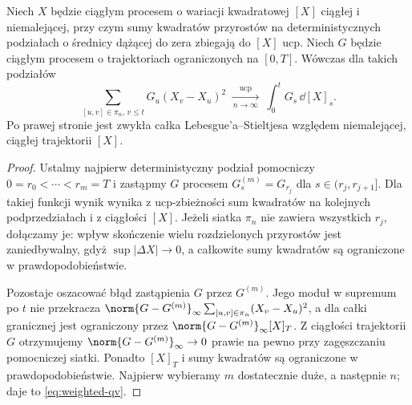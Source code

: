\begin{lemat}
\label{lem:weighted-qv}
Niech $X$ będzie ciągłym procesem o wariacji kwadratowej
$[X]$ ciągłej i niemalejącej, przy czym sumy kwadratów
przyrostów na deterministycznych podziałach o średnicy
dążącej do zera zbiegają do $[X]$ ucp. Niech $G$ będzie
ciągłym procesem o trajektoriach ograniczonych na $[0,T]$.
Wówczas dla takich podziałów
\[
\sum_{[u,v]\in\pi_n,\,v\le t}G_u(X_v-X_u)^2
\ \xrightarrow[\,n\to\infty\,]{\mathrm{ucp}}\
\int_0^tG_s\,\dd[X]_s.
\tag{3.2}\label{eq:weighted-qv}
\]
Po prawej stronie jest zwykła całka Lebesgue'a--Stieltjesa
względem niemalejącej, ciągłej trajektorii $[X]$.
\end{lemat}
\begin{proof}
Ustalmy najpierw deterministyczny podział pomocniczy
$0=r_0<\cdots<r_m=T$ i zastąpmy $G$ procesem
$G^{(m)}_s=G_{r_j}$ dla $s\in(r_j,r_{j+1}]$.
Dla takiej funkcji wynik wynika z ucp-zbieżności
sum kwadratów na kolejnych podprzedziałach i z
ciągłości $[X]$. Jeżeli siatka $\pi_n$ nie zawiera
wszystkich $r_j$, dołączamy je: wpływ skończenie wielu
rozdzielonych przyrostów jest zaniedbywalny, gdyż
$\sup|\Delta X|\to0$, a całkowite sumy kwadratów są
ograniczone w prawdopodobieństwie.

Pozostaje oszacować błąd zastąpienia $G$ przez $G^{(m)}$.
Jego moduł w supremum po $t$ nie przekracza
$\norm{G-G^{(m)}}_\infty\sum_{[u,v]\in\pi_n}(X_v-X_u)^2$,
a dla całki granicznej jest ograniczony przez
$\norm{G-G^{(m)}}_\infty[X]_T$. Z ciągłości trajektorii
$G$ otrzymujemy $\norm{G-G^{(m)}}_\infty\to0$ prawie
na pewno przy zagęszczaniu pomocniczej siatki. Ponadto
$[X]_T$ i sumy kwadratów są ograniczone w prawdopodobieństwie.
Najpierw wybieramy $m$ dostatecznie duże, a następnie $n$;
daje to \eqref{eq:weighted-qv}.
\end{proof}

